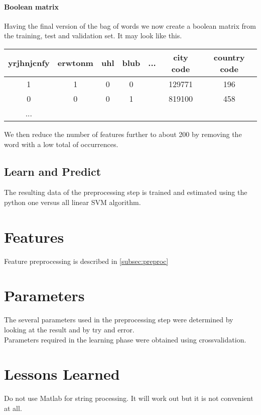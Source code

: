 \documentclass[a4paper, 11pt]{article}
\begin{document}
\paragraph{Boolean matrix} Having the final version of the bag of words we now create a boolean matrix from the training, test and validation set. It may look like this.

\begin{tabular}{|c|c|c|c|c|c|c|}
\hline 
yrjhnjcnfy & erwtonm & uhl & blub & ... & city code & country code \\ 
\hline 
1 & 1 & 0 & 0 &  & 129771 & 196 \\ 
\hline 
0 & 0 & 0 & 1 &  & 819100 & 458 \\ 
\hline 
... &  &  &  &  &  &  \\ 
\hline 
\end{tabular} 

We then reduce the number of features further to about 200 by removing the word with a low total of occurrences.

\subsection{Learn and Predict} 
The resulting data of the preprocessing step is trained and estimated using the python one versus all linear SVM algorithm.


\section{Features}

Feature preprocessing is described in \ref{subsec:preproc}

\section{Parameters}

The several parameters used in the preprocessing step were determined by looking at the result and by try and error.\\

Parameters required in the learning phase were obtained using crossvalidation.


\section{Lessons Learned} 

Do not use Matlab for string processing. It will work out but it is not convenient at all.
\end{document}
